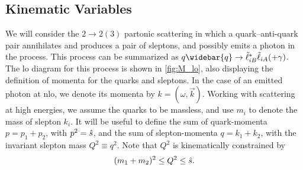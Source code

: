 \subsection{Kinematic Variables}
We will consider the $2\to 2(3)$ partonic scattering in which a quark--anti-quark pair annihilates and produces a pair of sleptons, and possibly emits a photon in the process. This process can be summarized as $q\widebar{q} \to \slepton_{iB}^*\slepton_{iA} (+\gamma)$.
The \gls{lo} diagram for this process is shown in \cref{fig:M_lo}, also displaying the definition of momenta for the quarks and sleptons.
In the case of an emitted photon at \gls{nlo}, we denote its momenta by $k = (\omega, \vec{k})$.
Working with scattering at high energies, we assume the quarks to be massless, and use $m_i$ to denote the mass of slepton $k_i$.
It will be useful to define the sum of quark-momenta $p=p_1+p_2$, with $p^2=\hat{s}$, and the sum of slepton-momenta $q=k_1+k_2$, with the invariant slepton mass $Q^2\equiv q^2$. Note that $Q^2$ is kinematically constrained by
\begin{equation}
    (m_1+m_2)^2 \leq Q^2 \leq \hat{s}.
    \label{eq:Q2_limits}
\end{equation}

